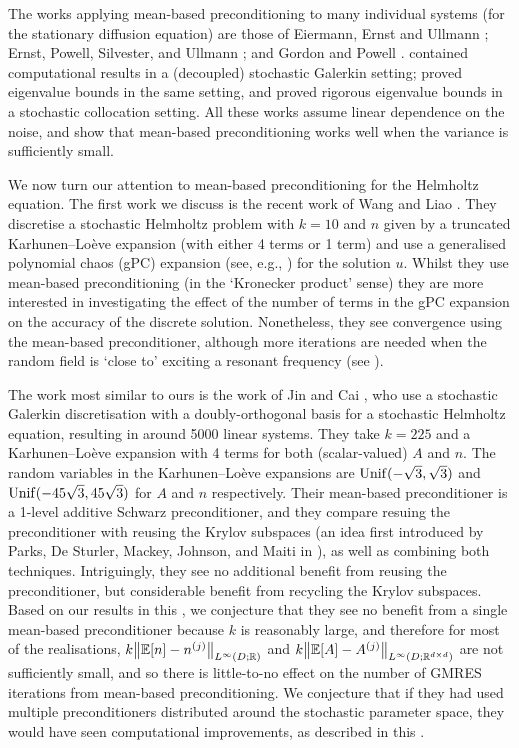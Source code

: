 The works applying mean-based preconditioning to many individual systems (for the stationary diffusion equation) are those of Eiermann, Ernst and Ullmann \cite{EiErUl:07}; Ernst, Powell, Silvester, and Ullmann \cite{ErPoSiUl:09}; and Gordon and Powell \cite{GoPo:12}. \cite{EiErUl:07} contained computational results in a (decoupled) stochastic Galerkin setting; \cite{ErPoSiUl:09} proved eigenvalue bounds in the same setting, and \cite{GoPo:12} proved rigorous eigenvalue bounds in a stochastic collocation setting. All these works assume linear dependence on the noise, and show that mean-based preconditioning works well when the variance is sufficiently small.

We now turn our attention to mean-based preconditioning for the Helmholtz equation. The first work we discuss is the recent work of Wang and Liao \cite{WaLi:19}. They discretise a stochastic Helmholtz problem with $k=10$ and $n$ given by a truncated Karhunen--Lo\`eve expansion (with either 4 terms or 1 term) and use a generalised polynomial chaos (gPC) expansion (see, e.g., \cite{XiKa:02}) for the solution $u$. Whilst they use mean-based preconditioning (in the `Kronecker product' sense) they are more interested in investigating the effect of the number of terms in the gPC expansion on the accuracy of the discrete solution. Nonetheless, they see convergence using the mean-based preconditioner, although more iterations are needed when the random field is `close to' exciting a resonant frequency (see \cite[Example 4.2]{WaLi:19}).

The work most similar to ours is the work of Jin and Cai \cite{JiCa:09}, who use a stochastic Galerkin discretisation with a doubly-orthogonal basis for a stochastic Helmholtz equation, resulting in around 5000 linear systems. They take $k = 225$ and a Karhunen--Lo\`eve expansion with 4 terms for both (scalar-valued) $A$ and $n$. The random variables in the Karhunen--Lo\`eve expansions are $\mathrm{Unif}(-\sqrt{3},\sqrt{3})$ and $\mathrm{Unif}(-45\sqrt{3},45\sqrt{3})$ for $A$ and $n$ respectively. Their mean-based preconditioner is a 1-level additive Schwarz preconditioner, and they compare resuing the preconditioner with reusing the Krylov subspaces (an idea first introduced by Parks, De Sturler, Mackey, Johnson, and Maiti in \cite{PadeMaJoMa:06}), as well as combining both techniques. Intriguingly, they see no additional benefit from reusing the preconditioner, but considerable benefit from recycling the Krylov subspaces. Based on our results in this , we conjecture that they see no benefit from a single mean-based preconditioner because $k$ is reasonably large, and therefore for most of the realisations, $k\NLiDRR{\EXP{n}-\nsj}$ and $k\NLiDRRdtd{\EXP{A}-\Asj}$ are not sufficiently small, and so there is little-to-no effect on the number of GMRES iterations from mean-based preconditioning. We conjecture that if they had used multiple preconditioners distributed around the stochastic parameter space, they would have seen computational improvements, as described in this .
    
